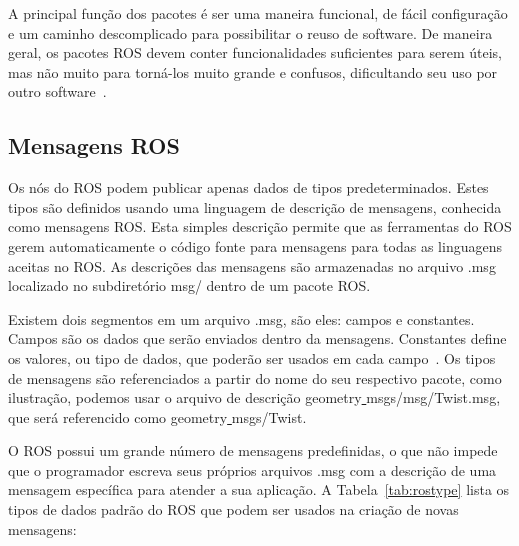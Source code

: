 A principal função dos pacotes é ser uma maneira funcional, de fácil configuração e um caminho descomplicado para possibilitar o reuso de software. De maneira geral, os pacotes ROS devem conter funcionalidades suficientes para serem úteis, mas não muito para torná-los muito grande e confusos, dificultando seu uso por outro software~\cite{rosgentle}.


\subsection{Mensagens ROS}
Os nós do ROS podem publicar apenas dados de tipos predeterminados. Estes tipos são definidos usando uma linguagem de descrição de mensagens, conhecida como mensagens ROS\@. Esta simples descrição permite que as ferramentas do ROS gerem automaticamente o código fonte para mensagens para todas as linguagens aceitas no ROS\@. As descrições das mensagens são armazenadas no arquivo .msg localizado no subdiretório msg/ dentro de um pacote ROS\@.

Existem dois segmentos em um arquivo .msg, são eles: campos e constantes. Campos são os dados que serão enviados dentro da mensagens. Constantes define os valores, ou tipo de dados, que poderão ser usados em cada campo~\cite{RosMessage}. Os tipos de mensagens são referenciados a partir do nome do seu respectivo pacote, como ilustração, podemos usar o arquivo de descrição geometry\underline{ }msgs/msg/Twist.msg, que será referencido como geometry\underline{ }msgs/Twist. 

O ROS possui um grande número de mensagens predefinidas, o que não impede que o programador escreva seus próprios arquivos .msg com a descrição de uma mensagem específica para atender a sua aplicação. A Tabela~\ref{tab:rostype} lista os tipos de dados padrão do ROS que podem ser usados na criação de novas mensagens: 

